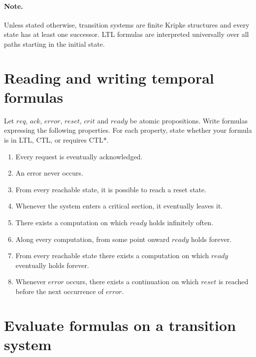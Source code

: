 \documentclass[11pt,a4paper]{tutorial}
\begin{document}
\maketitle

\paragraph{Note.} Unless stated otherwise, transition systems are finite Kripke structures and every
state has at least one successor.  LTL formulas are interpreted universally over
all paths starting in the initial state.

\section{Reading and writing temporal formulas}

\begin{exercise}
Let $req$, $ack$, $error$, $reset$, $crit$ and $ready$ be atomic propositions.
Write formulas expressing the following properties.  For each property, state
whether your formula is in LTL, CTL, or requires CTL*.

\begin{enumerate}[label=(\alph*)]
  \item Every request is eventually acknowledged.
  \item An error never occurs.
  \item From every reachable state, it is possible to reach a reset state.
  \item Whenever the system enters a critical section, it eventually leaves it.
  \item There exists a computation on which $ready$ holds infinitely often.
  \item Along every computation, from some point onward $ready$ holds forever.
  \item From every reachable state there exists a computation on which $ready$
        eventually holds forever.
  \item Whenever $error$ occurs, there exists a continuation on which $reset$
        is reached before the next occurrence of $error$.
\end{enumerate}
\end{exercise}


\section{Evaluate formulas on a transition system}
\end{document}
